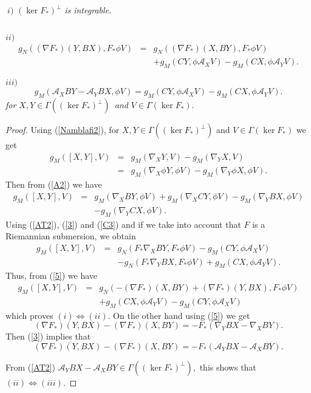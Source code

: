\documentclass{amsart}
\theoremstyle{plain}
\numberwithin{equation}{section}
\begin{document}
$\ i)$ $(\ker F_{\ast })^{\bot }$ \textit{is integrable. }

$\ $

$ii)$ 
\begin{eqnarray*}
g_{N}((\nabla F_{\ast })(Y,BX),F_{\ast }\phi V) &=&g_{N}((\nabla F_{\ast
})(X,BY),F_{\ast }\phi V) \\
&&+g_{M}(CY,\phi \mathcal{A}_{X}V)-g_{M}(CX,\phi \mathcal{A}_{Y}V).
\end{eqnarray*}

$iii)$\begin{equation*}
g_{M}(\mathcal{A}_{X}BY-\mathcal{A}_{Y}BX,\phi V)=g_{M}(CY,\phi \mathcal{A}_{X}V)-g_{M}(CX,\phi \mathcal{A}_{Y}V).
\end{equation*}\textit{for }$X,Y\in \Gamma ((\ker F_{\ast })^{\bot })$\textit{\ and }$V\in
\Gamma (\ker F_{\ast }).$

\begin{proof}
Using (\ref{Namblafi2}), for $X,Y\in \Gamma ((\ker F_{\ast })^{\bot })$ and $V\in \Gamma (\ker F_{\ast })$ we get\begin{eqnarray*}
g_{M}(\left[ X,Y\right] ,V) &=&g_{M}(\nabla _{X}Y,V)-g_{M}(\nabla _{Y}X,V) \\
&=&g_{M}(\nabla _{X}\phi Y,\phi V)-g_{M}(\nabla _{Y}\phi X,\phi V).
\end{eqnarray*}Then from (\ref{A2}) we have\begin{eqnarray*}
g_{M}(\left[ X,Y\right] ,V) &=&g_{M}(\nabla _{X}BY,\phi V)+g_{M}(\nabla
_{X}CY,\phi V)-g_{M}(\nabla _{Y}BX,\phi V) \\
&&-g_{M}(\nabla _{Y}CX,\phi V).
\end{eqnarray*}Using (\ref{AT2}), (\ref{3}) and (\ref{C3}) and if we take into account that 
$F$ is a Riemannian submersion, we obtain\begin{eqnarray*}
g_{M}(\left[ X,Y\right] ,V) &=&g_{N}(F_{\ast }\nabla _{X}BY,F_{\ast }\phi
V)-g_{M}(CY,\phi \mathcal{A}_{X}V) \\
&&-g_{N}(F_{\ast }\nabla _{Y}BX,F_{\ast }\phi V)+g_{M}(CX,\phi \mathcal{A}_{Y}V).
\end{eqnarray*}Thus, from (\ref{5}) we have 
\begin{eqnarray*}
g_{M}(\left[ X,Y\right] ,V) &=&g_{N}(-(\nabla F_{\ast })(X,BY)+(\nabla
F_{\ast })(Y,BX),F_{\ast }\phi V) \\
&&+g_{M}(CX,\phi \mathcal{A}_{Y}V)-g_{M}(CY,\phi \mathcal{A}_{X}V)
\end{eqnarray*}which proves $(i)\Leftrightarrow (ii).$ On the other hand using (\ref{5}) we
get\begin{equation*}
(\nabla F_{\ast })(Y,BX)-(\nabla F_{\ast })(X,BY)=-F_{\ast }(\nabla
_{Y}BX-\nabla _{X}BY).
\end{equation*}Then (\ref{3}) implies that 
\begin{equation*}
(\nabla F_{\ast })(Y,BX)-(\nabla F_{\ast })(X,BY)=-F_{\ast }(\mathcal{A}_{Y}BX-\mathcal{A}_{X}BY).
\end{equation*}

From (\ref{AT2}) $\mathcal{A}_{Y}BX-\mathcal{A}_{X}BY\in \Gamma ((\ker
F_{\ast })^{\bot }),$ this shows that $(ii)\Leftrightarrow (iii).$
\end{proof}
\end{document}
